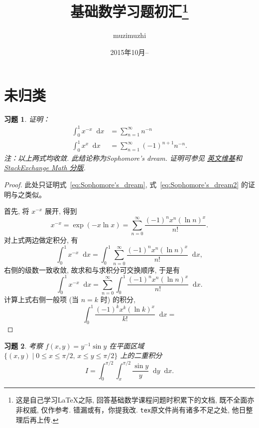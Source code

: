 \documentclass{ctexart}
\title{基础数学习题初汇\thanks{这是自己学习\LaTeX 之际, 回答基础数学课程问题时积累下的文档, 既不全面亦非权威, 仅作参考. 错漏或有，你提我改. \texttt{tex}原文件尚有诸多不足之处, 他日整理后再上传. %
            }}
\author{muzimuzhi}
\date{2015年10月--}
\renewcommand\dif{\mathop{}\!\mathrm{d}}
\newcommand{\dx}{\ensuremath{\dif x}}
\theoremstyle{plain}
\newtheorem{exercise}{习题}[subsection]
\theoremstyle{definition}
\begin{document}
\maketitle
\tableofcontents
\newpage







\section{未归类}
\begin{exercise}
    证明：
    \begin{align}
    \int_0^1 x^{-x} \dx &= \sum_{n = 1}^{\infty} n^{-n} \label{eq:Sophomore's_dream}\\
    \int_0^1 x^x \dx &= \sum_{n = 1}^{\infty} (-1)^{n+1} n^{-n}. \label{eq:Sophomore's_dream2}
    \end{align}
    \emph{注：以上两式均收敛. 此结论称为Sophomore's dream. 证明可参见%
        \href{https://en.wikipedia.org/wiki/Sophomore\%27s_dream}{英文维基}和 %
        \href{http://math.stackexchange.com/questions/237513/series-as-an-integral-sophomores-dream}{StackExchange Math 分版}.}
\end{exercise}

\begin{proof}
    此处只证明式~\eqref{eq:Sophomore's_dream}, 式~\eqref{eq:Sophomore's_dream2} 的证明与之类似。
    
    首先, 将 $x^{-x}$ 展开, 得到
    \begin{equation*}
    x^{-x} = \exp(-x \ln x) = \sum_{n = 0}^{\infty} \frac{(-1)^n x^n (\ln n)^x}{n!}.
    \end{equation*}
    对上式两边做定积分, 有
    \begin{equation*}
    \int_0^1 x^{-x} \dx 
    = \int_0^1 \sum_{n = 0}^{\infty} \frac{(-1)^n x^n (\ln n)^x}{n!} \dx,
    \end{equation*}
    右侧的级数一致收敛, 故求和与求积分可交换顺序, 于是有
    \begin{equation*}
    \int_0^1 x^{-x} \dx 
    = \sum_{n = 0}^{\infty} \int_0^1 \frac{(-1)^n x^n (\ln n)^x}{n!} \dx.
    \end{equation*}
    计算上式右侧一般项 (当 $n = k$ 时) 的积分, 
    \[
    \int_0^1 \frac{(-1)^k x^k (\ln k)^x}{k!} \dx
    = 
    \]
\end{proof}

\begin{exercise}
    考察 $f(x, y) = y^{-1} \sin y$ 在平面区域 $\{ (x, y) \mid 0 \le x \le \pi/2,\, x \le y \le \pi / 2 \}$ 上的二重积分
    \[
    I= \int_0^{\pi / 2} \int_x^{\pi / 2} \frac{\sin y}{y} \dif y \dx.
    \]
\end{exercise}
\end{document}
